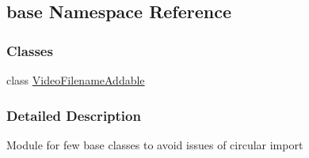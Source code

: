 \hypertarget{namespacebase}{\subsection{base Namespace Reference}
\label{namespacebase}
}
\subsubsection*{Classes}
\begin{DoxyCompactItemize}
\item 
class \hyperlink{classbase_1_1VideoFilenameAddable}{Video\-Filename\-Addable}
\end{DoxyCompactItemize}


\subsubsection{Detailed Description}
\begin{DoxyVerb}Module for few base classes to avoid issues of circular import\end{DoxyVerb}
 